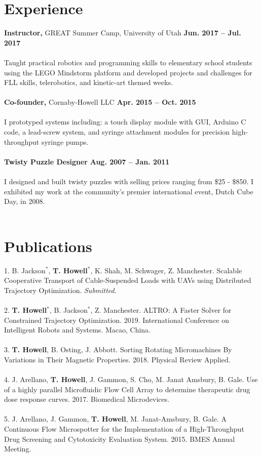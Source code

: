 \documentclass[margin,line]{res}
\begin{document}
\begin{resume}
\section{\sc Experience}
{\bf Instructor,} GREAT Summer Camp, University of Utah
\hfill {\bf Jun. 2017 – Jul. 2017}\\
\\
Taught practical robotics and programming skills to elementary school students using the LEGO Mindstorm platform and developed projects and challenges for FLL skills, telerobotics, and kinetic-art themed weeks.\\
\\
{\bf Co-founder,} Cornaby-Howell LLC
\hfill {\bf Apr. 2015 – Oct. 2015}\\
\\
I prototyped systems including: a touch display module with GUI, Arduino C code, a lead-screw system,
and syringe attachment modules for precision high-throughput syringe pumps.\\
\\
{\bf Twisty Puzzle Designer} 
\hfill {\bf Aug. 2007 – Jan. 2011}\\
\\
I designed and built twisty puzzles with selling prices ranging from \$25 - \$850. I exhibited my work at
the community’s premier international event, Dutch Cube Day, in 2008.\\
\\

\section{\sc Publications}
1. B. Jackson$^*$, \textbf{T. Howell}$^*$, K. Shah, M. Schwager, Z. Manchester. Scalable Cooperative Transport of Cable-Suspended Loads with UAVs
using Distributed Trajectory Optimization. \textit{Submitted}.\\
\\
2. \textbf{T. Howell}$^*$, B. Jackson$^*$, Z. Manchester. ALTRO: A Faster Solver for Constrained Trajectory Optimization. 2019. International Conference on Intelligent Robots and Systems. Macao, China.\\
\\
3. \textbf{T. Howell}, B. Osting, J. Abbott. Sorting Rotating Micromachines By Variations in Their Magnetic
Properties. 2018. Physical Review Applied.\\
\\
4. J. Arellano, \textbf{T. Howell}, J. Gammon, S. Cho, M. Janat Amsbury, B. Gale. Use of a highly parallel
Microfluidic Flow Cell Array to determine therapeutic drug dose response curves. 2017. Biomedical
Microdevices.\\
\\
5. J. Arellano, J. Gammon, \textbf{T. Howell}, M. Janat-Amsbury, B. Gale. A Continuous Flow Microspotter for
the Implementation of a High-Throughput Drug Screening and Cytotoxicity Evaluation System.
2015. BMES Annual Meeting.
\\

\end{resume}
\end{document}
